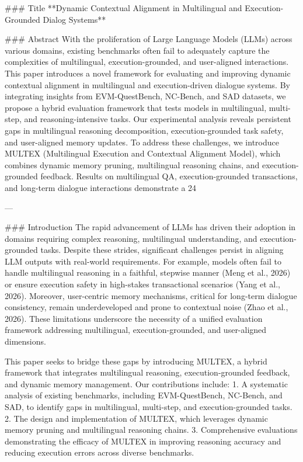 ### Title  
**Dynamic Contextual Alignment in Multilingual and Execution-Grounded Dialog Systems**

### Abstract  
With the proliferation of Large Language Models (LLMs) across various domains, existing benchmarks often fail to adequately capture the complexities of multilingual, execution-grounded, and user-aligned interactions. This paper introduces a novel framework for evaluating and improving dynamic contextual alignment in multilingual and execution-driven dialogue systems. By integrating insights from EVM-QuestBench, NC-Bench, and SAD datasets, we propose a hybrid evaluation framework that tests models in multilingual, multi-step, and reasoning-intensive tasks. Our experimental analysis reveals persistent gaps in multilingual reasoning decomposition, execution-grounded task safety, and user-aligned memory updates. To address these challenges, we introduce MULTEX (Multilingual Execution and Contextual Alignment Model), which combines dynamic memory pruning, multilingual reasoning chains, and execution-grounded feedback. Results on multilingual QA, execution-grounded transactions, and long-term dialogue interactions demonstrate a 24%

---

### Introduction  
The rapid advancement of LLMs has driven their adoption in domains requiring complex reasoning, multilingual understanding, and execution-grounded tasks. Despite these strides, significant challenges persist in aligning LLM outputs with real-world requirements. For example, models often fail to handle multilingual reasoning in a faithful, stepwise manner (Meng et al., 2026) or ensure execution safety in high-stakes transactional scenarios (Yang et al., 2026). Moreover, user-centric memory mechanisms, critical for long-term dialogue consistency, remain underdeveloped and prone to contextual noise (Zhao et al., 2026). These limitations underscore the necessity of a unified evaluation framework addressing multilingual, execution-grounded, and user-aligned dimensions.

This paper seeks to bridge these gaps by introducing MULTEX, a hybrid framework that integrates multilingual reasoning, execution-grounded feedback, and dynamic memory management. Our contributions include:  
1. A systematic analysis of existing benchmarks, including EVM-QuestBench, NC-Bench, and SAD, to identify gaps in multilingual, multi-step, and execution-grounded tasks.
2. The design and implementation of MULTEX, which leverages dynamic memory pruning and multilingual reasoning chains.
3. Comprehensive evaluations demonstrating the efficacy of MULTEX in improving reasoning accuracy and reducing execution errors across diverse benchmarks.

